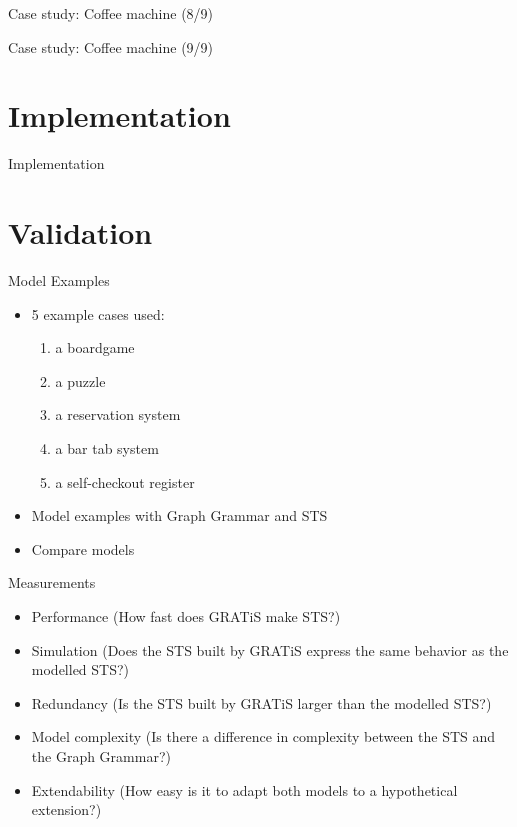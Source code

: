 \documentclass{FMTslides}
\begin{document}
\begin{frame}{Case study: Coffee machine (8/9)}
\begin{figure}

\end{figure}
\end{frame}

\begin{frame}{Case study: Coffee machine (9/9)}
\begin{figure}

\end{figure}
\end{frame}

\section[Implementation]{Implementation}

\begin{frame}{Implementation}
\begin{figure}

\end{figure}
\end{frame}

\section[Validation]{Validation}

\begin{frame}{Model Examples}
\begin{itemize}[<+->]
  \item 5 example cases used:
  \begin{enumerate}
    \item a boardgame
    \item a puzzle
    \item a reservation system
    \item a bar tab system
    \item a self-checkout register
  \end{enumerate}
  \item Model examples with Graph Grammar and STS
  \item Compare models
\end{itemize}
\end{frame}

\begin{frame}{Measurements}
  \begin{itemize}[<+->]
  \item Performance (How fast does GRATiS make STS?)
  \item Simulation (Does the STS built by GRATiS express the same behavior as the modelled STS?)
  \item Redundancy (Is the STS built by GRATiS larger than the modelled STS?)
  \item Model complexity (Is there a difference in complexity between the STS and the Graph Grammar?)
  \item Extendability (How easy is it to adapt both models to a hypothetical extension?)
  \end{itemize}
\end{frame}
\end{document}
